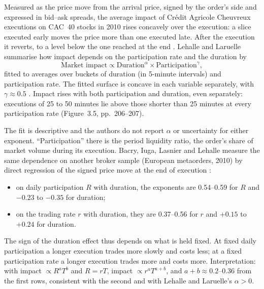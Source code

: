 \begin{qfevidence}\label{ev:intraday-impact-profile}
 Measured as the price move from the arrival price, signed by the order's side and expressed in bid--ask spreads, the average impact of Crédit Agricole Cheuvreux executions on CAC~40 stocks in 2010 rises concavely over the execution: a slice executed early moves the price more than one executed late. After the execution it reverts, to a level below the one reached at the end \citep[chap.~3, sec.~3.2.1, Figure~3.3, pp.~204--206]{alpha-laruelle}. Lehalle and Laruelle summarise how impact depends on the participation rate and the duration by
\[ \text{Market impact}\propto\text{Duration}^{\alpha}\times\text{Participation}^{\gamma}, \]
fitted to averages over buckets of duration (in 5-minute intervals) and participation rate. The fitted surface is concave in each variable separately, with $\gamma\approx0.5$ \citep[same sec., eq.~(3.1), Figure~3.6, pp.~207--209]{alpha-laruelle}. Impact rises with both participation and duration, even separately: executions of 25 to 50 minutes lie above those shorter than 25 minutes at every participation rate (Figure~3.5, pp.~206--207).

 The fit is descriptive and the authors do not report $\alpha$ or uncertainty for either exponent. ``Participation'' there is the period liquidity ratio, the order's share of market volume during its execution. Bacry, Iuga, Lasnier and Lehalle measure the same dependence on another broker sample (European metaorders, 2010) by direct regression of the signed price move at the end of execution \citep[arXiv preprint of 9 Dec.\ 2014, sec.~3.2, Table~2, p.~8]{wide-bacry-life-cycle}:
\begin{itemize}
\item on daily participation $R$ with duration, the exponents are 0.54--0.59 for $R$ and $-0.23$ to $-0.35$ for duration;
\item on the trading rate $r$ with duration, they are 0.37--0.56 for $r$ and $+0.15$ to $+0.24$ for duration.
\end{itemize}
The sign of the duration effect thus depends on what is held fixed. At fixed daily participation a longer execution trades more slowly and costs less; at a fixed participation rate a longer execution trades more and costs more. Interpretation: with impact $\propto R^aT^b$ and $R=rT$, impact $\propto r^aT^{a+b}$, and $a+b\approx0.2$--0.36 from the first rows, consistent with the second and with Lehalle and Laruelle's $\alpha>0$.


\end{qfevidence}
